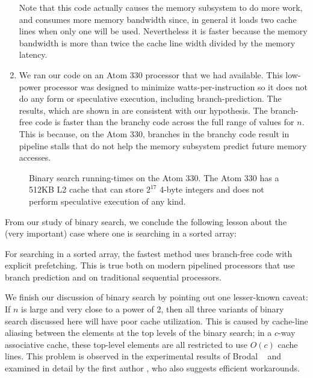 \documentclass{patmorin}
\begin{document}
\begin{enumerate}
   Note that this code actually causes the memory subsystem to do more
   work, and consumes more memory bandwidth since, in general it loads
   two cache lines when only one will be used.  Nevertheless it is faster
   because the memory bandwidth is more than twice the cache line width
   divided by the memory latency.

\item We ran our code on an Atom 330 processor that we had available. This
   low-power processor was designed to minimize watts-per-instruction
   so it does not do any form or speculative execution, including
   branch-prediction. The results, which are shown in 
   are consistent with our hypothesis.  The branch-free code is faster
   than the branchy code across the full range of values for $n$.
   This is because, on the Atom 330, branches in the branchy code result
   in pipeline stalls that do not help the memory subsystem predict
   future memory accesses.
\end{enumerate}

\begin{figure}
   \caption{Binary search running-times on the Atom 330. The Atom 330
   has a 512KB L2 cache that can store $2^{17}$ 4-byte integers and does
   not perform speculative execution of any kind.}
\end{figure}

From our study of binary search, we conclude the following lesson about
the (very important) case where one is searching in a sorted array:

\begin{lesson}
  For searching in a sorted array, the fastest method uses branch-free
  code with explicit prefetching.  This is true both on modern pipelined
  processors that use branch prediction and on traditional sequential
  processors.
\end{lesson}

We finish our discussion of binary search by pointing out one lesser-known
caveat:  If $n$ is large and very close to a power of 2, then all
three variants of binary search discussed here will have poor cache
utilization.  This is caused by cache-line aliasing between the elements
at the top levels of the binary search; in a $c$-way associative cache,
these top-level elements are all restricted to use $O(c)$ cache lines.
This problem is observed in the experimental results of Brodal \etal\
\cite[Section~4.2]{brodal.fagerberg.ea:cache} and examined in detail
by the first author \cite{khuong:binary}, who also suggests efficient
workarounds.
\end{document}
